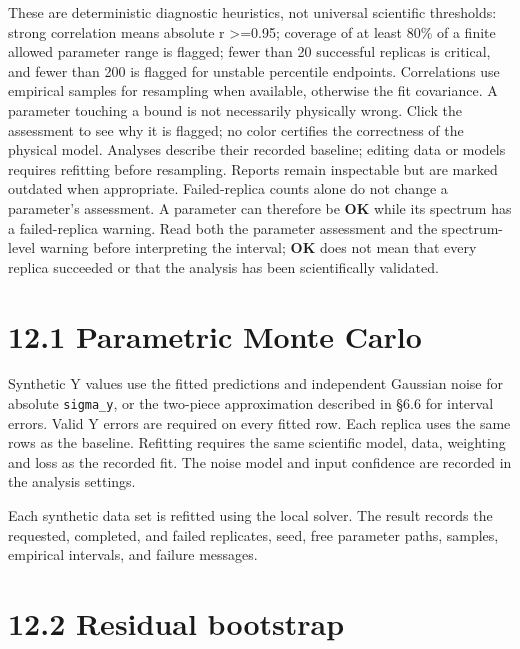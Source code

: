 \documentclass[
  10pt,
  a4paper,
  oneside]{scrreprt}
\begin{document}
These are deterministic diagnostic heuristics, not universal scientific
thresholds: strong correlation means absolute r \textgreater=0.95;
coverage of at least 80\% of a finite allowed parameter range is
flagged; fewer than 20 successful replicas is critical, and fewer than
200 is flagged for unstable percentile endpoints. Correlations use
empirical samples for resampling when available, otherwise the fit
covariance. A parameter touching a bound is not necessarily physically
wrong. Click the assessment to see why it is flagged; no color certifies
the correctness of the physical model. Analyses describe their recorded
baseline; editing data or models requires refitting before resampling.
Reports remain inspectable but are marked outdated when appropriate.
Failed-replica counts alone do not change a parameter's assessment. A
parameter can therefore be \textbf{OK} while its spectrum has a
failed-replica warning. Read both the parameter assessment and the
spectrum-level warning before interpreting the interval; \textbf{OK}
does not mean that every replica succeeded or that the analysis has been
scientifically validated.

\hypertarget{parametric-monte-carlo}{%
\section{12.1 Parametric Monte Carlo}\label{parametric-monte-carlo}}

Synthetic Y values use the fitted predictions and independent Gaussian
noise for absolute \texttt{sigma\_y}, or the two-piece approximation
described in §6.6 for interval errors. Valid Y errors are required on
every fitted row. Each replica uses the same rows as the baseline.
Refitting requires the same scientific model, data, weighting and loss
as the recorded fit. The noise model and input confidence are recorded
in the analysis settings.

Each synthetic data set is refitted using the local solver. The result
records the requested, completed, and failed replicates, seed, free
parameter paths, samples, empirical intervals, and failure messages.

\hypertarget{residual-bootstrap}{%
\section{12.2 Residual bootstrap}\label{residual-bootstrap}}
\end{document}
